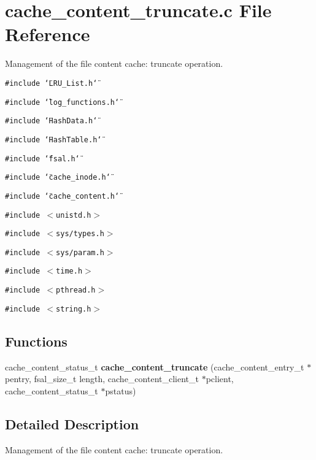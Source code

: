 \section{cache\_\-content\_\-truncate.c File Reference}
\label{cache__content__truncate_8c}
Management of the file content cache: truncate operation. 

{\tt \#include \char`\"{}LRU\_\-List.h\char`\"{}}\par
{\tt \#include \char`\"{}log\_\-functions.h\char`\"{}}\par
{\tt \#include \char`\"{}Hash\-Data.h\char`\"{}}\par
{\tt \#include \char`\"{}Hash\-Table.h\char`\"{}}\par
{\tt \#include \char`\"{}fsal.h\char`\"{}}\par
{\tt \#include \char`\"{}cache\_\-inode.h\char`\"{}}\par
{\tt \#include \char`\"{}cache\_\-content.h\char`\"{}}\par
{\tt \#include $<$unistd.h$>$}\par
{\tt \#include $<$sys/types.h$>$}\par
{\tt \#include $<$sys/param.h$>$}\par
{\tt \#include $<$time.h$>$}\par
{\tt \#include $<$pthread.h$>$}\par
{\tt \#include $<$string.h$>$}\par
\subsection*{Functions}
\begin{CompactItemize}
\item 
cache\_\-content\_\-status\_\-t {\bf cache\_\-content\_\-truncate} (cache\_\-content\_\-entry\_\-t $\ast$pentry, fsal\_\-size\_\-t length, cache\_\-content\_\-client\_\-t $\ast$pclient, cache\_\-content\_\-status\_\-t $\ast$pstatus)
\end{CompactItemize}


\subsection{Detailed Description}
Management of the file content cache: truncate operation. 

